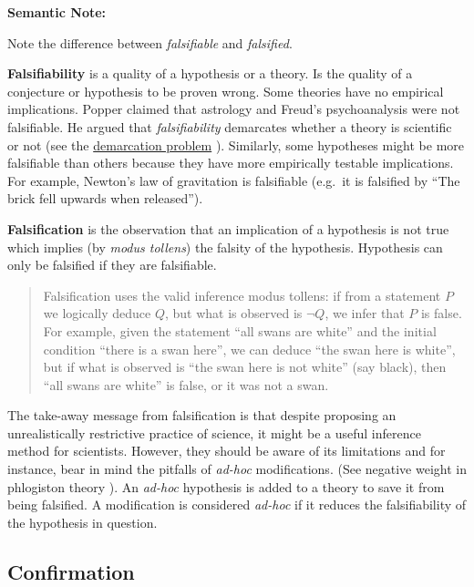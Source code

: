 \documentclass[
]{book}
\begin{document}
\begin{tipbox}

\textbf{Semantic Note:}

Note the difference between \emph{falsifiable} and \emph{falsified}.

\textbf{Falsifiability} is a quality of a hypothesis or a theory. Is the quality of a conjecture or hypothesis to be proven wrong. Some theories have no empirical implications. Popper claimed that astrology and Freud's psychoanalysis were not falsifiable. He argued that \emph{falsifiability} demarcates whether a theory is scientific or not (see the \href{https://plato.stanford.edu/entries/pseudo-science/}{demarcation problem} \citep{sep-pseudo-science}). Similarly, some hypotheses might be more falsifiable than others because they have more empirically testable implications. For example, Newton's law of gravitation is falsifiable (e.g.~it is falsified by ``The brick fell upwards when released'').

\textbf{Falsification} is the observation that an implication of a hypothesis is not true which implies (by \emph{modus tollens}) the falsity of the hypothesis. Hypothesis can only be falsified if they are falsifiable.

\begin{quote}
Falsification uses the valid inference modus tollens: if from a statement \(P\) we logically deduce \(Q\), but what is observed is \(\lnot Q\), we infer that \(P\) is false. For example, given the statement ``all swans are white'' and the initial condition ``there is a swan here'', we can deduce ``the swan here is white'', but if what is observed is ``the swan here is not white'' (say black), then ``all swans are white'' is false, or it was not a swan.
\end{quote}

\end{tipbox}

The take-away message from falsification is that despite proposing an unrealistically restrictive practice of science, it might be a useful inference method for scientists. However, they should be aware of its limitations and for instance, bear in mind the pitfalls of \emph{ad-hoc} modifications. (See negative weight in phlogiston theory \citep{phlogiston}). An \emph{ad-hoc} hypothesis is added to a theory to save it from being falsified. A modification is considered \emph{ad-hoc} if it reduces the falsifiability of the hypothesis in question.

\hypertarget{confirmation}{%
\subsection{Confirmation}\label{confirmation}}
\end{document}
